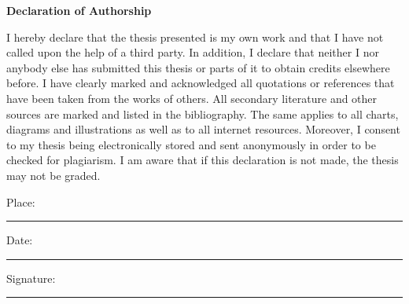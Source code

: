 \documentclass{DESSThesis}
\begin{document}
\def \TypeofThesis{Master's Thesis}
\def \TitleofThesis{Prove of Concept of Trust-minimized Cross-Chain Bridge from Bitcoin L1 to Ethereum L2}
\def \AuthorofThesis{Kai-Yan Pan}
\def \Supervisor{Prof. Dr. Markus Strohmaier} %
\def \Advisor{Stefano Balietti, Ph.D.}




\cleardoublepage %
\thispagestyle{empty} %
\begin{center}
    \vspace*{5cm}
    {\Large\bfseries Declaration of Authorship}
\end{center}

\vspace{1.5cm}

\begin{spacing}{1.5}
\noindent I hereby declare that the thesis presented is my own work and that I have not called upon the help of a third party. In addition, I declare that neither I nor anybody else has submitted this thesis or parts of it to obtain credits elsewhere before. I have clearly marked and acknowledged all quotations or references that have been taken from the works of others. All secondary literature and other sources are marked and listed in the bibliography. The same applies to all charts, diagrams and illustrations as well as to all internet resources. Moreover, I consent to my thesis being electronically stored and sent anonymously in order to be checked for plagiarism. I am aware that if this declaration is not made, the thesis may not be graded.
\end{spacing}

\vspace{2cm}

\noindent Place: \rule{6cm}{0.4pt} \hfill Date: \rule{4cm}{0.4pt}

\vspace{2cm}

\noindent Signature: \rule{10cm}{0.4pt}
\end{document}
